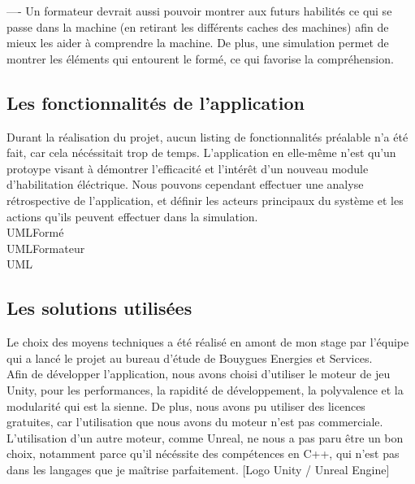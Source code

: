 \documentclass[a4paper]{article}
\begin{document}
        ---- Un formateur devrait aussi pouvoir montrer aux futurs habilités ce qui se passe dans la machine (en retirant les différents caches des machines) afin de mieux les aider à comprendre la machine. De plus, une simulation permet de montrer les éléments qui entourent le formé, ce qui favorise la compréhension. \\

    \subsection{Les fonctionnalités de l'application}

    Durant la réalisation du projet, aucun listing de fonctionnalités préalable n'a été fait, car cela nécéssitait trop de temps. L'application en elle-même n'est qu'un protoype visant à démontrer l'efficacité et l'intérêt d'un nouveau module d'habilitation éléctrique. Nous pouvons cependant effectuer une analyse rétrospective de l'application, et définir les acteurs principaux du système et les actions qu'ils peuvent effectuer dans la simulation. \\

    UMLFormé \\

    UMLFormateur \\

    UML \\

    \subsection{Les solutions utilisées}

    Le choix des moyens techniques a été réalisé en amont de mon stage par l'équipe qui a lancé le projet au bureau d'étude de Bouygues Energies et Services. \\ 

    Afin de développer l'application, nous avons choisi d'utiliser le moteur de jeu Unity, pour les performances, la rapidité de développement, la polyvalence et la modularité qui est la sienne. De plus, nous avons pu utiliser des licences gratuites, car l'utilisation que nous avons du moteur n'est pas commerciale. L'utilisation d'un autre moteur, comme Unreal, ne nous a pas paru être un bon choix, notamment parce qu'il nécéssite des compétences en C++, qui n'est pas dans les langages que je maîtrise parfaitement. [Logo Unity / Unreal Engine] \\
\end{document}
